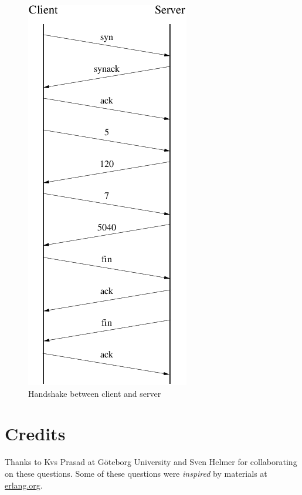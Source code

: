 \documentclass[12pt]{exam}
\begin{document}
\begin{figure}[htb]
\begin{center}
\includegraphics[scale=0.5]{images/ex7diagram.png}
\end{center}
\caption{Handshake between client and server}
\label{fig:threeway}
\end{figure}


\section*{Credits}
Thanks to Kvs Prasad at G\"{o}teborg University and Sven Helmer for collaborating on these questions.
Some of these questions were \emph{inspired} by materials at \url{erlang.org}.
\end{document}
